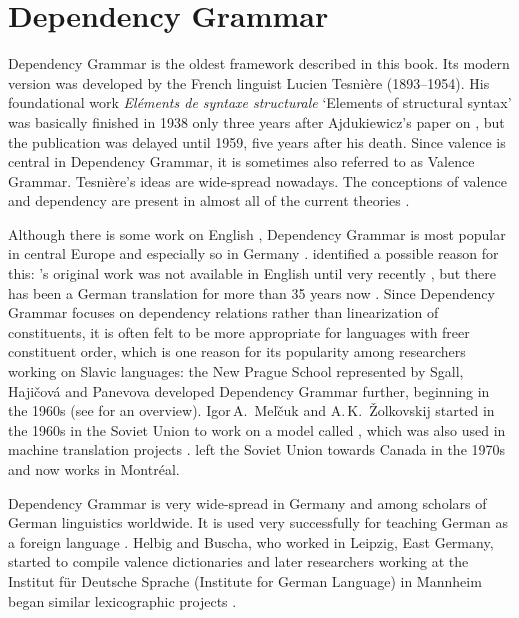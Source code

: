 \chapter{Dependency Grammar}
\label{Kapitel-DG}

Dependency Grammar is the oldest framework described in this book. Its modern version was developed by the
French linguist Lucien Tesnière (1893--1954). His foundational work \emph{Eléments de syntaxe
  structurale} `Elements of structural syntax' was basically finished in 1938 only three years after
Ajdukiewicz's paper on \cg \citeyearpar{Ajdukiewicz35a-u}, but the publication
was delayed until 1959, five years after his death\nocite{Tesniere59a-u}. Since valence is central
in Dependency Grammar, it is sometimes also referred to as Valence Grammar. 
Tesnière's ideas are wide-spread nowadays. The conceptions of valence and dependency are present in
almost all of the current theories \citep[--263, 284]{AF2010a}.

Although there is some work on English \citep{Anderson71a-u,Hudson84a-u}, Dependency Grammar is most popular in central Europe and especially so in Germany \citep[--57]{Engel96a}. \citet[]{AF2010a} identified a possible reason for this: \tes's
original work was not available in English until very recently \citep{Tesniere2015a-not-crossreferenced}, but there has
been a German translation for more than 35 years now \citep{Tesniere80a-u}. Since Dependency Grammar focuses on dependency relations rather than
linearization of constituents, it is often felt to be more appropriate for languages with freer
constituent order, which is one reason for its popularity among researchers working on Slavic
languages: the New Prague School represented by Sgall, Hajičová and Panevova developed Dependency Grammar further,
beginning in the 1960s (see \citealp{HS2003a-u} for an overview).  Igor\,A.\ Meľčuk and
A.\,K.\ Žolkovskij started in the 1960s in the Soviet Union to work on a model called \mtt, which was also used in machine
translation projects \citep{Melcuk64a-u,Melcuk81a,Melcuk88a-u,Kahane2003a-u}. \mel left the
Soviet Union towards Canada in the 1970s and now works in Montréal. 

Dependency Grammar is very wide-spread in Germany and among scholars of German linguistics
worldwide. It is used very successfully for teaching German as a foreign language
\citep{HB69a-u,HB98a}. Helbig and Buscha, who worked in Leipzig, East Germany, started to
compile valence dictionaries \citep{HS69a-u} and later researchers working at the Institut für
Deutsche Sprache (Institute for German Language) in Mannheim began similar lexicographic projects \citep{SKSR2004a-u}. 


